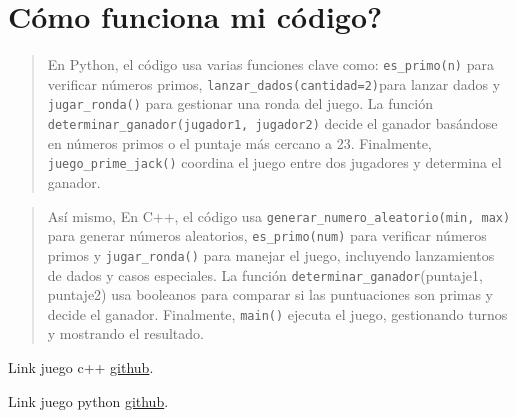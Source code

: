 \documentclass{article}
\begin{document}
\section{Cómo funciona mi código?}
\begin{quote}
    En Python, el código usa varias funciones clave como: \verb|es_primo(n)| para verificar números primos, \verb|lanzar_dados(cantidad=2)|para lanzar dados y \verb|jugar_ronda()| para gestionar una ronda del juego. La función \verb|determinar_ganador(jugador1, jugador2)| decide el ganador basándose en números primos o el puntaje más cercano a 23. Finalmente, \verb|juego_prime_jack()| coordina el juego entre dos jugadores y determina el ganador.
\end{quote}
\begin{quote}
    Así mismo, En C++, el código usa \verb|generar_numero_aleatorio(min, max)| para generar números aleatorios, \verb|es_primo(num)| para verificar números primos y \verb|jugar_ronda()| para manejar el juego, incluyendo lanzamientos de dados y casos especiales. La función \verb|determinar_ganador|(puntaje1, puntaje2) usa booleanos para comparar si las puntuaciones son primas y decide el ganador. Finalmente, \verb|main()| ejecuta el juego, gestionando turnos y mostrando el resultado.
\end{quote}
Link juego c++ \href{https://github.com/Vale0911/c-2/blob/master/TallerIA_Ciclos/prime_jack23.cpp}{github}.

Link juego python \href{https://github.com/Vale0911/python/blob/master/TallerIA_Ciclos/Prime_jack23.py}{github}.
\end{document}
